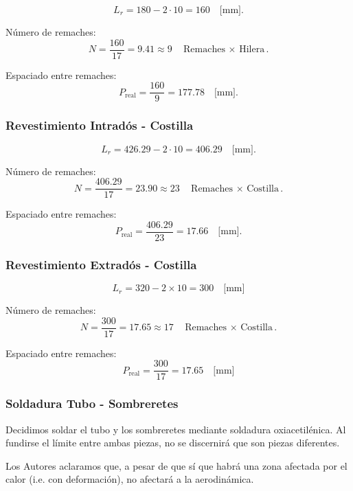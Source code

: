 \begin{equation}
    L_r = 180 - 2 \cdot 10 = 160 \quad \text{[mm]}.
\end{equation}

Número de remaches:
\begin{equation}
    N = \dfrac{160}{17} = 9.41 \approx 9 \quad \text{Remaches $\times$ Hilera}.
\end{equation}

Espaciado entre remaches:
\begin{equation}
    P_{\text{real}} = \dfrac{160}{9} = 177.78 \quad \text{[mm]}.
\end{equation}

\subsubsection{Revestimiento Intradós - Costilla}

\begin{equation}
    L_r = 426.29 - 2 \cdot 10 = 406.29 \quad \text{[mm]}.
\end{equation}

Número de remaches:
\begin{equation}
    N = \dfrac{406.29}{17} = 23.90 \approx 23 \quad \text{Remaches $\times$ Costilla}.
\end{equation}

Espaciado entre remaches:
\begin{equation}
    P_{\text{real}} = \dfrac{406.29}{23} = 17.66 \quad \text{[mm]}.
\end{equation}

\subsubsection{Revestimiento Extradós - Costilla}
\begin{equation}
    L_r = 320 - 2 \times 10 = 300 \quad \text{[mm]} 
\end{equation}

Número de remaches:
\begin{equation}
    N = \dfrac{300}{17} = 17.65 \approx 17 \quad \text{Remaches $\times$ Costilla}.
\end{equation}

Espaciado entre remaches:
\begin{equation}
    P_{\text{real}} = \dfrac{300}{17} = 17.65 \quad \text{[mm]}
\end{equation}

\subsubsection{Soldadura Tubo - Sombreretes}
Decidimos soldar el tubo y los sombreretes mediante soldadura oxiacetilénica. Al fundirse el límite entre ambas piezas, no se discernirá que son piezas diferentes.

Los Autores aclaramos que, a pesar de que sí que habrá una zona afectada por el calor (i.e. con deformación), no afectará a la aerodinámica.